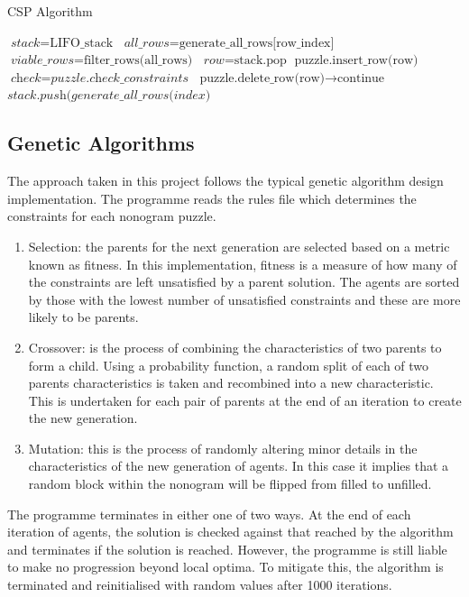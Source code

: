 \documentclass{svproc}
\begin{document}
\begin{algorithm}
    \caption{CSP Algorithm}\label{euclid}
    \begin{algorithmic}[2]
        \State $\textit{stack} = \text{LIFO\_stack}$
        \State $\textit{all\_rows} = \text{generate\_all\_rows[row\_index]}$
        \State $\textit{viable\_rows} = \text{filter\_rows(all\_rows)}$
        \State $\textit{row} = \text{stack.pop}$
        \State $\text{puzzle.insert\_row(row)}$
        \State $\textit{check} = \textit{puzzle.check\_constraints}$
        \State $\text{puzzle.delete\_row(row)} \to \text{continue}$
        \EndIf
        \State $\textit{stack.push(generate\_all\_rows(index)}$
        \EndWhile
        \EndWhile
    \end{algorithmic}
\end{algorithm}

\subsection{Genetic Algorithms}
The approach taken in this project follows the typical genetic algorithm design implementation. The programme reads the rules file which determines the constraints for each nonogram puzzle.
\begin{enumerate}
\item Selection:
the parents for the next generation are selected based on a metric known as fitness. In this implementation, fitness is a measure of how many of the constraints are left unsatisfied by a parent solution. The agents are sorted by those with the lowest number of unsatisfied constraints and these are more likely to be parents.

\item Crossover:
is the process of combining the characteristics of two parents to form a child. Using a probability function, a random split of each of two parents characteristics is taken and recombined into a new characteristic. This is undertaken for each pair of parents at the end of an iteration to create the new generation.

\item Mutation: this is the process of randomly altering minor details in the characteristics of the new generation of agents. In this case it implies that a random block within the nonogram will be flipped from filled to unfilled.
\end{enumerate}
The programme terminates in either one of two ways. At the end of each iteration of agents, the solution is checked against that reached by the algorithm and terminates if the solution is reached. However, the programme is still liable to make no progression beyond local optima. To mitigate this, the algorithm is terminated and reinitialised with random values after 1000 iterations.
\end{document}
